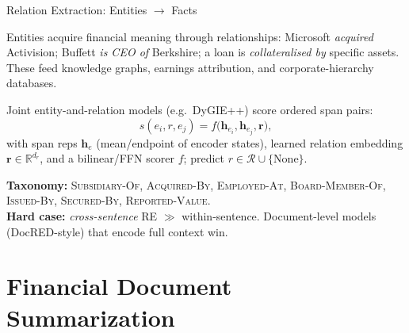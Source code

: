 \documentclass[9pt,t]{beamer}
\begin{document}
\begin{frame}{Relation Extraction: Entities $\to$ Facts}
\begin{bigpicture}
Entities acquire financial meaning through relationships: Microsoft
\emph{acquired} Activision; Buffett \emph{is CEO of} Berkshire; a loan is
\emph{collateralised by} specific assets. These feed knowledge graphs,
earnings attribution, and corporate-hierarchy databases.
\end{bigpicture}

\begin{underhood}
Joint entity-and-relation models (e.g.\ DyGIE++) score ordered span pairs:
\[
s(e_i, r, e_j) = f\bigl(\mathbf{h}_{e_i}, \mathbf{h}_{e_j}, \mathbf{r}\bigr),
\]
with span reps $\mathbf{h}_{e}$ (mean/endpoint of encoder states), learned
relation embedding $\mathbf{r}\in\mathbb{R}^{d_r}$, and a bilinear/FFN scorer $f$;
predict $r \in \mathcal{R}\cup\{\text{None}\}$.
\end{underhood}

\medskip
\textbf{Taxonomy:} \textsc{Subsidiary-Of}, \textsc{Acquired-By},
\textsc{Employed-At}, \textsc{Board-Member-Of}, \textsc{Issued-By},
\textsc{Secured-By}, \textsc{Reported-Value}.
\\[2pt]
\textbf{Hard case:} \emph{cross-sentence} RE $\gg$ within-sentence. Document-level
models (DocRED-style) that encode full context win.
\end{frame}

\section{Financial Document Summarization}
\end{document}
